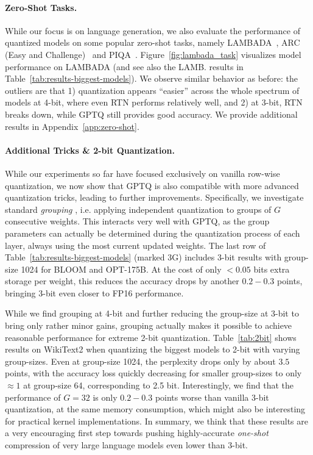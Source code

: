 \paragraph{Zero-Shot Tasks.} While our focus is on language generation, we also evaluate the performance of quantized models on some popular zero-shot tasks, namely LAMBADA~\cite{paperno2016lambada}, ARC (Easy and Challenge)~\cite{boratko2018systematic} and  PIQA~\cite{tata2003piqa}. 
Figure~\ref{fig:lambada_task} visualizes model performance on LAMBADA (and see also the LAMB. results in Table~\ref{tab:results-biggest-models}). 
We observe similar behavior as before: the outliers are that 1) quantization appears ``easier'' across the whole spectrum of models at 4-bit, where even RTN performs relatively well, and 2) at 3-bit, RTN breaks down, while GPTQ still provides good accuracy. We provide additional results in Appendix~\ref{app:zero-shot}.

\paragraph{Additional Tricks \& 2-bit Quantization.} While our experiments so far have focused exclusively on vanilla row-wise quantization, we now show that GPTQ is also compatible with more advanced quantization tricks, leading to further improvements. Specifically, we investigate standard \textit{grouping} \cite{alistarh2016qsgd, park2022nuqmm}, i.e. applying independent quantization to groups of $G$ consecutive weights. This interacts very well with GPTQ, as the group parameters can actually be determined during the quantization process of each layer, always using the most current updated weights. The last row of Table~\ref{tab:results-biggest-models} (marked 3G) includes 3-bit results with group-size 1024 for BLOOM and OPT-175B. At the cost of only $< 0.05$ bits extra storage per weight, this reduces the accuracy drops by another $0.2 - 0.3$ points, bringing 3-bit even closer to FP16 performance.

While we find grouping at 4-bit and further reducing the group-size at 3-bit to bring only rather minor gains, grouping actually makes it possible to achieve reasonable performance for extreme 2-bit quantization. Table~\ref{tab:2bit} shows results on WikiText2 when quantizing the biggest models to 2-bit with varying group-sizes. Even at group-size 1024, the perplexity drops only by about $3.5$ points, with the accuracy loss quickly decreasing for smaller group-sizes to only $\approx 1$ at group-size 64, corresponding to 2.5 bit. Interestingly, we find that the performance of $G = 32$ is only $0.2 - 0.3$ points worse than vanilla 3-bit quantization, at the same memory consumption, which might also be interesting for practical kernel implementations. In summary, we think that these results are a very encouraging first step towards pushing highly-accurate \emph{one-shot} compression of very large language models even lower than 3-bit.

